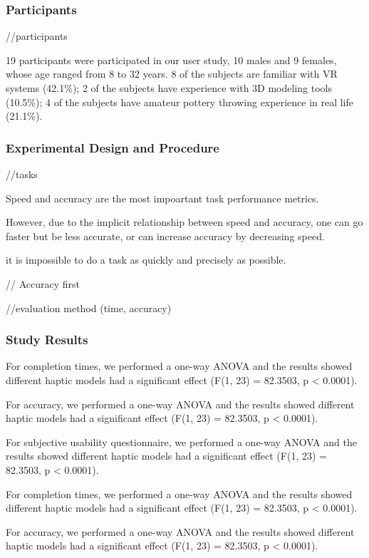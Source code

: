 \subsubsection{Participants}

//participants

19 participants were participated in our user study, 10 males and 9 females, whose age ranged from 8 to 32 years. 8 of the subjects are familiar with VR systems (42.1\%); 2 of the subjects have experience with 3D modeling tools (10.5\%); 4 of the subjects have amateur pottery throwing experience in real life (21.1\%).


\subsubsection{Experimental Design and Procedure}

//tasks


Speed and accuracy are the most impoartant task performance metrics.

However, due to the implicit relationship between speed and accuracy, one can go faster but be less accurate, or can increase accuracy by decreasing speed.

it is impossible to do a task as quickly and precisely as possible.

// Accuracy first

//evaluation method (time, accuracy)



\subsubsection{Study Results}

For completion times, we performed a one-way ANOVA and the results showed different haptic models had a significant effect (F(1, 23) = 82.3503, p < 0.0001). 

For accuracy, we performed a one-way ANOVA and the results showed different haptic models had a significant effect (F(1, 23) = 82.3503, p < 0.0001). 

For subjective usability questionnaire, we performed a one-way ANOVA and the results showed different haptic models had a significant effect (F(1, 23) = 82.3503, p < 0.0001).


For completion times, we performed a one-way ANOVA and the results showed different haptic models had a significant effect (F(1, 23) = 82.3503, p < 0.0001). 

For accuracy, we performed a one-way ANOVA and the results showed different haptic models had a significant effect (F(1, 23) = 82.3503, p < 0.0001). 

